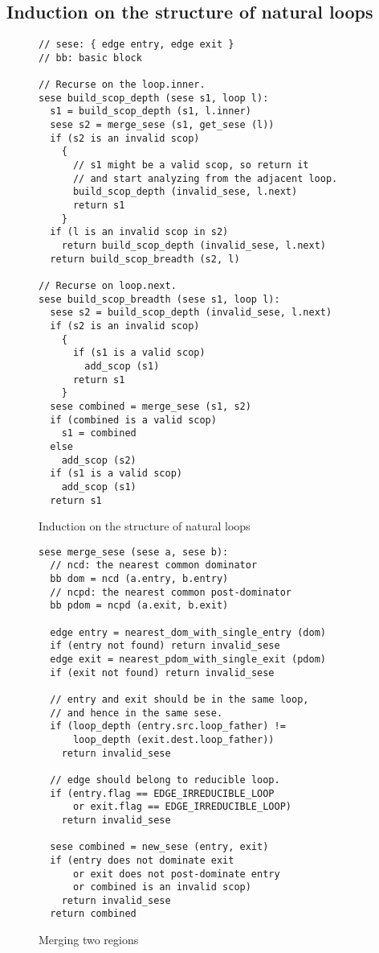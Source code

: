 \documentclass{sig-alternate}
\begin{document}
\subsection{Induction on the structure of natural loops}
\label{subsec:induction}

\begin{figure}
\begin{verbatim}
// sese: { edge entry, edge exit }
// bb: basic block

// Recurse on the loop.inner.
sese build_scop_depth (sese s1, loop l):
  s1 = build_scop_depth (s1, l.inner)
  sese s2 = merge_sese (s1, get_sese (l))
  if (s2 is an invalid scop)
    {
      // s1 might be a valid scop, so return it
      // and start analyzing from the adjacent loop.
      build_scop_depth (invalid_sese, l.next)
      return s1
    }
  if (l is an invalid scop in s2)
    return build_scop_depth (invalid_sese, l.next)
  return build_scop_breadth (s2, l)

// Recurse on loop.next.
sese build_scop_breadth (sese s1, loop l):
  sese s2 = build_scop_depth (invalid_sese, l.next)
  if (s2 is an invalid scop)
    {
      if (s1 is a valid scop)
        add_scop (s1)
      return s1
    }
  sese combined = merge_sese (s1, s2)
  if (combined is a valid scop)
    s1 = combined
  else
    add_scop (s2)
  if (s1 is a valid scop)
    add_scop (s1)
  return s1
\end{verbatim}
\caption{Induction on the structure of natural loops}
\label{fig:induction}
\end{figure}

\begin{figure}
\begin{verbatim}
sese merge_sese (sese a, sese b):
  // ncd: the nearest common dominator
  bb dom = ncd (a.entry, b.entry)
  // ncpd: the nearest common post-dominator
  bb pdom = ncpd (a.exit, b.exit)

  edge entry = nearest_dom_with_single_entry (dom)
  if (entry not found) return invalid_sese
  edge exit = nearest_pdom_with_single_exit (pdom)
  if (exit not found) return invalid_sese

  // entry and exit should be in the same loop,
  // and hence in the same sese.
  if (loop_depth (entry.src.loop_father) !=
      loop_depth (exit.dest.loop_father))
    return invalid_sese

  // edge should belong to reducible loop.
  if (entry.flag == EDGE_IRREDUCIBLE_LOOP
      or exit.flag == EDGE_IRREDUCIBLE_LOOP)
    return invalid_sese

  sese combined = new_sese (entry, exit)
  if (entry does not dominate exit
      or exit does not post-dominate entry
      or combined is an invalid scop)
    return invalid_sese
  return combined
\end{verbatim}
\caption{Merging two \SESE{} regions}
\label{fig:merge-sese}
\end{figure}
\end{document}
